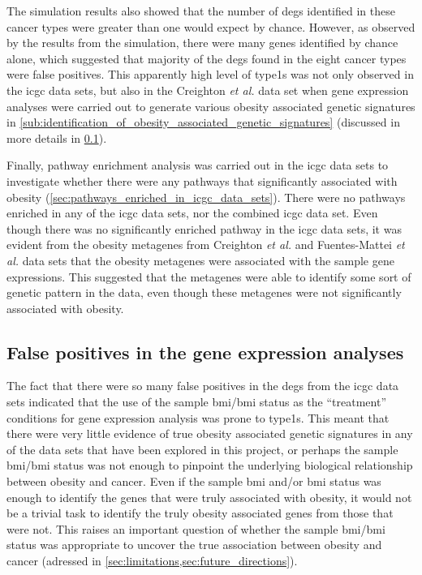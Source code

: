 The simulation results also showed that the number of \glspl{deg} identified in these cancer types were greater than one would expect by chance.
However, as observed by the results from the simulation, there were many genes identified by chance alone, which suggested that majority of the \glspl{deg} found in the eight cancer types were false positives.
This apparently high level of \Glspl{type1} was not only observed in the \gls{icgc} data sets, but also in the Creighton \textit{et al.} data set when gene expression analyses were carried out to generate various obesity associated genetic signatures in \cref{sub:identification_of_obesity_associated_genetic_signatures} (discussed in more details in \cref{sub:false_positives_in_gene_expression_analyses}).

Finally, pathway enrichment analysis was carried out in the \gls{icgc} data sets to investigate whether there were any pathways that significantly associated with obesity (\cref{sec:pathways_enriched_in_icgc_data_sets}).
There were no pathways enriched in any of the \gls{icgc} data sets, nor the combined \gls{icgc} data set.
Even though there was no significantly enriched  pathway in the \gls{icgc} data sets, it was evident from the obesity metagenes from Creighton \textit{et al.} and Fuentes-Mattei \textit{et al.} data sets that the obesity metagenes were associated with the sample gene expressions.
This suggested that the metagenes were able to identify some sort of genetic pattern in the data, even though these metagenes were not significantly associated with obesity.

\subsection{False positives in the gene expression analyses}
\label{sub:false_positives_in_gene_expression_analyses}

The fact that there were so many false positives in the \glspl{deg} from the \gls{icgc} data sets indicated that the use of the sample \gls{bmi}/\gls{bmi} status as the ``treatment'' conditions for gene expression analysis was prone to \Glspl{type1}.
This meant that there were very little evidence of true obesity associated genetic signatures in any of the data sets that have been explored in this project, or perhaps the sample \gls{bmi}/\gls{bmi} status was not enough to pinpoint the underlying biological relationship between obesity and cancer.
Even if the sample \gls{bmi} and/or \gls{bmi} status was enough to identify the genes that were truly associated with obesity, it would not be a trivial task to identify the truly obesity associated genes from those that were not.
This raises an important question of whether the sample \gls{bmi}/\gls{bmi} status was appropriate to uncover the true association between obesity and cancer (adressed in \cref{sec:limitations,sec:future_directions}).

